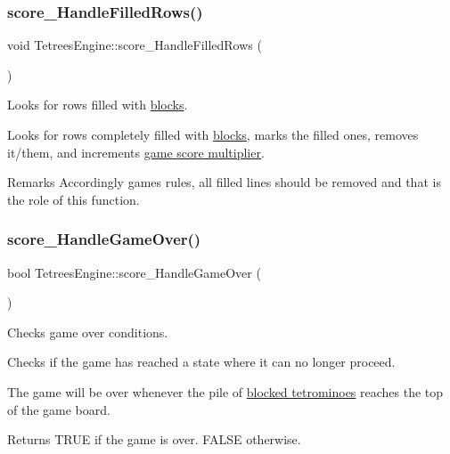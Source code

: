 \subsubsection{\texorpdfstring{score\+\_\+\+Handle\+Filled\+Rows()}{score\_HandleFilledRows()}}
{\footnotesize\ttfamily void Tetrees\+Engine\+::score\+\_\+\+Handle\+Filled\+Rows (\begin{DoxyParamCaption}{ }\end{DoxyParamCaption})\hspace{0.3cm}{\ttfamily [private]}}



Looks for rows filled with \hyperlink{TetreesDefs_8hpp_ad8f0654cf997b7ea7eb14924d0b1ea33}{blocks}. 

Looks for rows completely filled with \hyperlink{TetreesDefs_8hpp_ad8f0654cf997b7ea7eb14924d0b1ea33}{blocks}, marks the filled ones, removes it/them, and increments \hyperlink{structgame__score__t}{game score multiplier}.

\begin{DoxyRemark}{Remarks}
Accordingly game\textquotesingle{}s rules, all filled lines should be removed and that is the role of this function. 
\end{DoxyRemark}
\mbox{\label{classTetreesEngine_a31898b1228f8b0381a82871669503b34}} 
\subsubsection{\texorpdfstring{score\+\_\+\+Handle\+Game\+Over()}{score\_HandleGameOver()}}
{\footnotesize\ttfamily bool Tetrees\+Engine\+::score\+\_\+\+Handle\+Game\+Over (\begin{DoxyParamCaption}{ }\end{DoxyParamCaption})\hspace{0.3cm}{\ttfamily [private]}}



Checks game over conditions. 

Checks if the game has reached a state where it can no longer proceed.

The game will be over whenever the pile of \hyperlink{classTetreesEngine_a0978ef1f287f00a8ed5a4af2d680b943}{blocked tetrominoes} reaches the top of the game board. \begin{DoxyReturn}{Returns}
\textquotesingle{}T\+R\+UE\textquotesingle{} if the game is over. \textquotesingle{}F\+A\+L\+SE\textquotesingle{} otherwise. 
\end{DoxyReturn}
\mbox{\label{classTetreesEngine_aa7d501cb6f73111321e1dadbc140ebc8}} 

